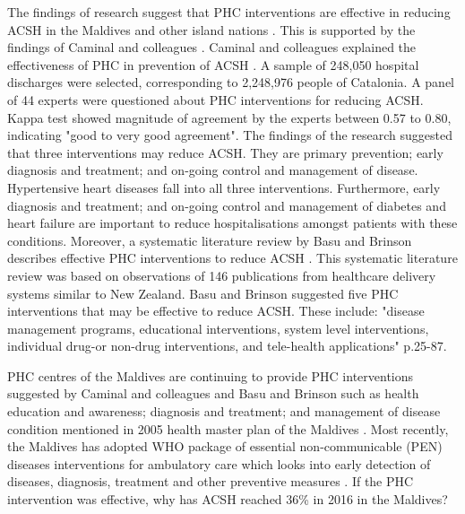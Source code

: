 The findings of research suggest that PHC interventions are effective in reducing ACSH in the Maldives and other island nations \cite{ansari2012patient,caminal2004role}. This is supported by the findings of Caminal and colleagues \cite{caminal2004role}. Caminal and colleagues explained the effectiveness of PHC in prevention of ACSH \cite{caminal2004role}. A sample of 248,050 hospital discharges were selected, corresponding to 2,248,976 people of Catalonia. A panel of 44 experts were questioned about PHC interventions for reducing ACSH. Kappa test showed magnitude of agreement by the experts between 0.57 to 0.80, indicating "good to very good agreement". The findings of the research suggested that three interventions may reduce ACSH. They are primary prevention; early diagnosis and treatment; and on-going control and management of disease. Hypertensive heart diseases fall into all three interventions. Furthermore, early diagnosis and treatment; and on-going control and management of diabetes and heart failure are important to reduce hospitalisations amongst patients with these conditions. Moreover, a systematic literature review by Basu and Brinson describes effective PHC interventions to reduce ACSH \cite{basu2008systematic}. This systematic literature review was based on observations of 146 publications from healthcare delivery systems similar to New Zealand. Basu and Brinson suggested five PHC interventions that may be effective to reduce ACSH. These include: "disease management programs,  educational interventions, system level interventions, individual drug-or non-drug interventions, and tele-health applications" \cite{basu2008systematic}p.25-87.  

PHC centres of the Maldives are continuing to provide PHC interventions suggested by Caminal and colleagues \citeyear{caminal2004role} and Basu and Brinson \citeyear{basu2008systematic} such as health education and awareness; diagnosis and treatment; and management of disease condition mentioned in 2005 health master plan of the Maldives \cite{MoH:masterplan:2006to2015}. Most recently, the Maldives has adopted WHO package of essential non-communicable (PEN) diseases interventions for ambulatory care which looks into early detection of diseases, diagnosis, treatment and other preventive measures \cite{MoH:SDGprofile:2017}. If the PHC intervention was effective, why has ACSH reached 36\% in 2016 in the Maldives?    

